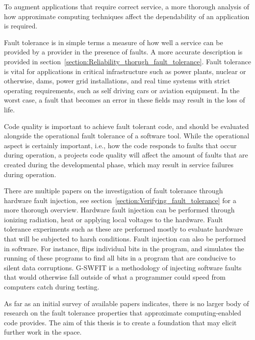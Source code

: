 To augment applications that require correct service, a more thorough analysis of how approximate computing techniques affect the dependability of an application is required.

Fault tolerance is in simple terms a measure of how well a service can be provided by a provider in the presence of faults. A more accurate description is provided in section~\ref{section:Reliability_thorugh_fault_tolerance}. Fault tolerance is vital for applications in critical infrastructure such as power plants, nuclear or otherwise, dams, power grid installations, and real time systems with strict operating requirements, such as self driving cars or aviation equipment. In the worst case, a fault that becomes an error in these fields may result in the loss of life. 

Code quality is important to achieve fault tolerant code, and should be evaluated alongside the operational fault tolerance of a software tool. While the operational aspect is certainly important, i.e., how the code responds to faults that occur during operation, a projects code quality will affect the amount of faults that are created during the developmental phase, which may result in service failures during operation. 

There are multiple papers on the investigation of fault tolerance through hardware fault injection, see section~\ref{section:Verifying_fault_tolerance} for a more thorough overview. Hardware fault injection can be performed through ionizing radiation, heat or applying local voltages to the hardware. Fault tolerance experiments such as these are performed mostly to evaluate hardware that will be subjected to harsh conditions. 
Fault injection can also be performed in software. For instance,  flips individual bits in the program, and simulates the running of these programs to find all bits in a program that are conducive to silent data corruptions.  G-SWFIT is a methodology of injecting software faults that would otherwise fall outside of what a programmer could speed from computers catch during testing. 


As far as an initial survey of available papers indicates, there is no larger body of research on the fault tolerance properties that approximate computing-enabled code provides. The aim of this thesis is to create a foundation that may elicit further work in the space.